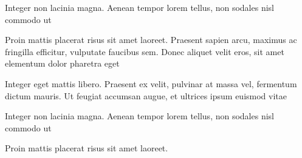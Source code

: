 \begin{alineascomponto}
	\item Integer non lacinia magna. Aenean tempor lorem tellus, non sodales nisl commodo ut
	\item Proin mattis placerat risus sit amet laoreet. Praesent sapien arcu, maximus ac fringilla efficitur, vulputate faucibus sem. Donec aliquet velit eros, sit amet elementum dolor pharetra eget
	\item Integer eget mattis libero. Praesent ex velit, pulvinar at massa vel, fermentum dictum mauris. Ut feugiat accumsan augue, et ultrices ipsum euismod vitae
	\begin{subalineascomponto}
		\item Integer non lacinia magna. Aenean tempor lorem tellus, non sodales nisl commodo ut
		\item Proin mattis placerat risus sit amet laoreet.
	\end{subalineascomponto}
\end{alineascomponto}
